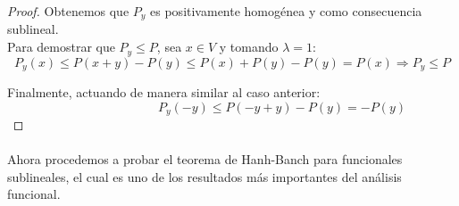 \begin{proof}
		Obtenemos que $ P_y $ es positivamente homogénea y como consecuencia sublineal. \\
		
		Para demostrar que $ P_y \leq P $, sea $ x \in V $ y tomando $ \lambda = 1 $: 
		\[ P_y(x) \leq P(x+y) - P(y) \leq P(x)+ P(y) - P(y) = P(x) \Longrightarrow P_y \leq P  \]
		
		Finalmente, actuando de manera similar al caso anterior:
		\[ \qquad \qquad \qquad \qquad P_y(-y) \leq P(-y+y) - P(y) = -P(y)  \]
		
	\end{proof}
	
	\paragraph{} Ahora procedemos a probar el teorema de Hanh-Banch para funcionales sublineales, el cual es uno de los resultados más importantes del análisis funcional.
	
